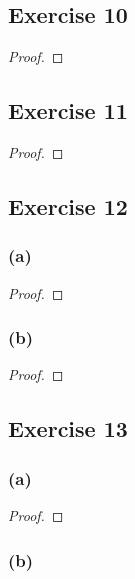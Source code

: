 \documentclass[14pt]{extarticle}
\begin{document}
\subsection{Exercise 10}

\begin{proof}

\end{proof}

\subsection{Exercise 11}

\begin{proof}

\end{proof}

\subsection{Exercise 12}

\subsubsection{(a)}

\begin{proof}

\end{proof}

\subsubsection{(b)}

\begin{proof}

\end{proof}

\subsection{Exercise 13}

\subsubsection{(a)}

\begin{proof}

\end{proof}

\subsubsection{(b)}
\end{document}
